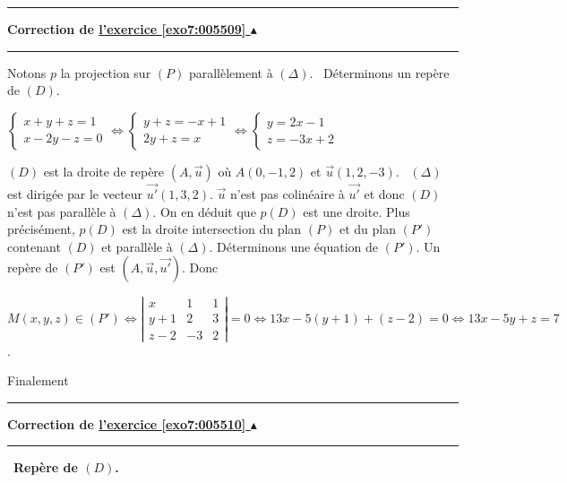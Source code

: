 \documentclass[11pt,a4paper]{article}
\newcounter{exo}
\newcommand{\correction}[1]{\hypertarget{cor7:#1}{}\label{cor7:#1}{\bf Correction de \hyperlink{exo7:#1}{l'exercice \ref{exo7:#1} $\blacktriangle$}}\vspace{1mm}\hrule\vspace{1mm}}
\newcommand{\fincorrection}{\vspace{1mm}\hrule\vspace*{7mm}}
\begin{document}
\begin{center}
\end{center}
\fincorrection
\correction{005509}
Notons $p$ la projection sur $(P)$ parallèlement à $(\Delta)$.
\textbullet~Déterminons un repère de $(D)$. 
\begin{center}$\left\{
\begin{array}{l}
x+y+z=1\\
x-2y-z=0
\end{array}
\right.\Leftrightarrow
\left\{
\begin{array}{l}
y+z=-x+1\\
2y+z=x
\end{array}
\right.
\Leftrightarrow
\left\{
\begin{array}{l}
y=2x-1\\
z=-3x+2
\end{array}
\right.
$
\end{center}
$(D)$ est la droite de repère $(A,\overrightarrow{u})$ où $A(0,-1,2)$ et $\overrightarrow{u}(1,2,-3)$.
\textbullet~$(\Delta)$ est dirigée par le vecteur $\overrightarrow{u'}(1,3,2)$. $\overrightarrow{u}$ n'est pas colinéaire à $\overrightarrow{u'}$ et donc $(D)$ n'est pas parallèle à $(\Delta)$. On en déduit que $p(D)$ est une droite. 
Plus précisément, $p(D)$ est la droite intersection du plan $(P)$ et du plan $(P')$ contenant $(D)$ et parallèle à $(\Delta)$. Déterminons une équation de $(P')$. Un repère de $(P')$ est $(A,\overrightarrow{u},\overrightarrow{u'})$. Donc

\begin{center}
$M(x,y,z)\in(P')\Leftrightarrow\left|
\begin{array}{ccc}
x&1&1\\
y+1&2&3\\
z-2&-3&2
\end{array}
\right|=0\Leftrightarrow 13x-5(y+1)+(z-2)=0\Leftrightarrow13x-5y+z=7$.
\end{center}

Finalement

\begin{center}
\end{center}
\fincorrection
\correction{005510}
\textbullet~\textbf{Repère de $(D)$.}
\end{document}
